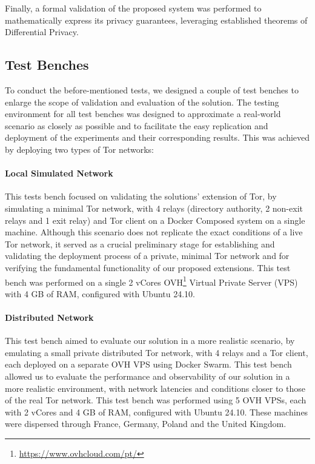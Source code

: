 Finally, a formal validation of the proposed system was performed to mathematically express its privacy guarantees, leveraging established theorems of Differential Privacy.

\subsection{Test Benches}\label{sec:testbenches}

To conduct the before-mentioned tests, we designed a couple of test benches to enlarge the scope of validation and evaluation of the solution. The testing environment for all test benches was designed to approximate a real-world scenario as closely as possible and to facilitate the easy replication and deployment of the experiments and their corresponding results. This was achieved by deploying two types of Tor networks:
\paragraph{Local Simulated Network} This tests bench focused on validating the solutions' extension of Tor, by simulating a minimal Tor network, with 4 relays (directory authority, 2 non-exit relays and 1 exit relay) and Tor client on a Docker Composed system on a single machine. Although this scenario does not replicate the exact conditions of a live Tor network, it served as a crucial preliminary stage for establishing and validating the deployment process of a private, minimal Tor network and for verifying the fundamental functionality of our proposed extensions. This test bench was performed on a single 2 vCores OVH\footnote{\url{https://www.ovhcloud.com/pt/}} Virtual Private Server (VPS) with 4 GB of RAM, configured with Ubuntu 24.10.
\paragraph{Distributed Network} This test bench aimed to evaluate our solution in a more realistic scenario, by emulating a small private distributed Tor network, with 4 relays and a Tor client, each deployed on a separate OVH VPS using Docker Swarm. This test bench allowed us to evaluate the performance and observability of our solution in a more realistic environment, with network latencies and conditions closer to those of the real Tor network. This test bench was performed using 5 OVH VPSs, each with 2 vCores and 4 GB of RAM, configured with Ubuntu 24.10. These machines were dispersed through France, Germany, Poland and the United Kingdom.

